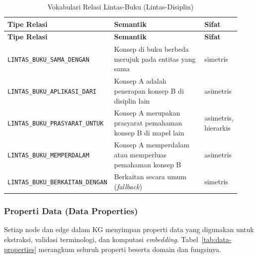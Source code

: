 \documentclass[main]{subfiles}
\begin{document}
\begin{longtable}{@{}p{0.38\linewidth}p{0.42\linewidth}p{0.13\linewidth}@{}}
  \caption{Vokabulari Relasi Lintas-Buku (Lintas-Disiplin)}
  \label{tab:relasi-lintas-buku}\\
  \toprule
  \textbf{Tipe Relasi} & \textbf{Semantik} & \textbf{Sifat} \\
  \midrule
  \endfirsthead
  \toprule
  \textbf{Tipe Relasi} & \textbf{Semantik} & \textbf{Sifat} \\
  \midrule
  \endhead
  \midrule
  \endfoot
  \bottomrule
  \endlastfoot
  \texttt{LINTAS\_BUKU\_SAMA\_DENGAN}
    & Konsep di buku berbeda merujuk pada entitas yang sama
    & simetris \\
  \texttt{LINTAS\_BUKU\_APLIKASI\_DARI}
    & Konsep A adalah penerapan konsep B di disiplin lain
    & asimetris \\
  \texttt{LINTAS\_BUKU\_PRASYARAT\_UNTUK}
    & Konsep A merupakan prasyarat pemahaman konsep B di mapel lain
    & asimetris, hierarkis \\
  \texttt{LINTAS\_BUKU\_MEMPERDALAM}
    & Konsep A memperdalam atau memperluas pemahaman konsep B
    & asimetris \\
  \texttt{LINTAS\_BUKU\_BERKAITAN\_DENGAN}
    & Berkaitan secara umum (\textit{fallback})
    & simetris \\
\end{longtable}

\subsubsection*{Properti Data (Data Properties)}

Setiap node dan edge dalam KG menyimpan properti data yang digunakan
untuk ekstraksi, validasi terminologi, dan komputasi
\textit{embedding}. Tabel~\ref{tab:data-properties} merangkum seluruh
properti beserta domain dan fungsinya.
\end{document}

